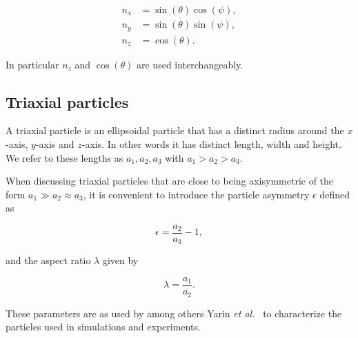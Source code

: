 \begin{subequations}\label{eq:nzEq}
\begin{align}
n_x 	&= \sin(\theta)\cos(\psi), \\
n_y 	&= \sin(\theta)\sin(\psi),\\
n_z		&= \cos(\theta).
\end{align}
\end{subequations}

\noindent In particular $n_z$ and $\cos(\theta)$ are used interchangeably.

\subsection{Triaxial particles}
A triaxial particle is an ellipsoidal particle that has a distinct radius around the $x$-axis, $y$-axis and $z$-axis. In other words it has distinct length, width and height. We refer to these lengths as $a_1, a_2, a_3$ with $a_1 > a_2 > a_3$.


When discussing triaxial particles that are close to being axisymmetric of the form $a_1 \gg a_2 \approx a_3$, it is convenient to introduce the particle asymmetry $\epsilon$ defined as

\begin{equation}\label{eq:epsilon}
\epsilon = \frac{a_2}{a_3} - 1,
\end{equation}

\noindent and the aspect ratio $\lambda$ given by

\begin{equation}\label{eq:lambda}
\lambda = \frac{a_1}{a_2}.
\end{equation}

\noindent These parameters are as used by among others Yarin \emph{et al.}~\cite{Yarin} to characterize the particles used in simulations and experiments.



